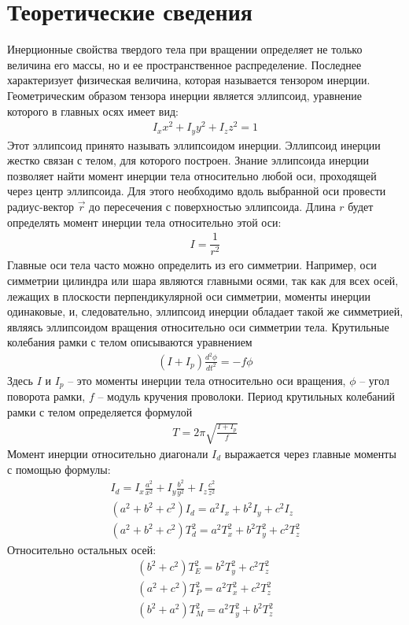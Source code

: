 \section{Теоретические сведения}
Инерционные свойства твердого тела при вращении определяет не
только величина его массы, но и ее пространственное распределение.
Последнее характеризует физическая величина, которая называется
тензором инерции. Геометрическим образом тензора инерции является эллипсоид,
уравнение которого в главных осях имеет вид: \begin{gather}
   I_x x^2 + I_y y^2 + I_z z^2 = 1
\end{gather}
Этот эллипсоид принято называть эллипсоидом инерции. Эллипсоид
инерции жестко связан с телом, для которого построен. Знание эллипсоида инерции
позволяет найти момент инерции тела относительно любой оси, проходящей через
центр эллипсоида. Для этого необходимо вдоль выбранной оси провести
радиус-вектор $ \vec{r} $ до пересечения с поверхностью эллипсоида. Длина $ r $  будет определять
момент инерции тела относительно этой оси: \begin{gather}
   I = \dfrac{1}{r^2}
\end{gather}
Главные оси тела часто можно определить из
его симметрии. Например, оси симметрии цилиндра или шара являются главными осями, так как
для всех осей, лежащих в плоскости перпендикулярной оси симметрии, моменты инерции одинаковые, и, следовательно, эллипсоид инерции обладает такой же симметрией, являясь эллипсоидом вращения относительно оси симметрии тела.
Крутильные колебания рамки с телом описываются уравнением \begin{gather}
   (I + I_p)\frac{d^2\phi}{dt^2} = - f \phi
\end{gather}
Здесь $ I $ и $ I_p $ -- это моменты инерции тела относительно оси вращения, $ \phi $ -- угол поворота рамки, $ f $ -- модуль кручения проволоки.
Период крутильных колебаний рамки с телом определяется формулой \begin{gather}
   T = 2\pi\sqrt{\frac{I + I_p}{ f}}
\end{gather}
Момент инерции относительно диагонали $ I_d $ выражается через главные моменты с помощью формулы: \begin{gather}
   I_d = I_x \frac{a^2}{x^2} + I_y\frac{b^2}{y^2} + I_z\frac{c^2}{z^2} \\
   (a^2 + b^2 + c^2)I_d = a^2I_x + b^2 I_y + c^2 I_z \\
   (a^2 + b^2 + c^2)T_d^2 = a^2T^2_x + b^2 T^2_y + c^2 T^2_z \label{firstcheck}
\end{gather}
Относительно остальных осей: \begin{gather}
   (b^2 + c^2)T^2_E = b^2 T_y^2 + c^2 T_z^2 \label{2check} \\
   (a^2 + c^2)T^2_P = a^2 T_x^2 + c^2 T_z^2 \label{3check}\\
   (b^2 + a^2)T^2_M = a^2 T_y^2 + b^2 T_z^2 \label{4check}
\end{gather}
